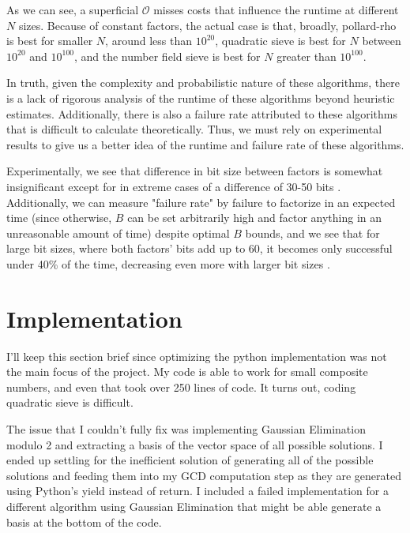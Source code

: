 \documentclass[11pt,reqno]{amsart}
\theoremstyle{definition}
\begin{document}
As we can see, a superficial $\mathcal{O}$ misses costs that influence the runtime at different $N$ sizes. Because of constant factors, the actual case is that, broadly, pollard-rho is best for smaller $N$, around less than $10^{20}$, quadratic sieve is best for $N$ between $10^{20}$ and $10^{100}$, and the number field sieve is best for $N$ greater than $10^{100}$.

In truth, given the complexity and probabilistic nature of these algorithms, there is a lack of rigorous analysis of the runtime of these algorithms beyond heuristic estimates. Additionally, there is also a failure rate attributed to these algorithms that is difficult to calculate theoretically. Thus, we must rely on experimental results to give us a better idea of the runtime and failure rate of these algorithms.

Experimentally, we see that difference in bit size between factors is somewhat insignificant except for in extreme cases of a difference of 30-50 bits \cite{li2021empirical}. Additionally, we can measure "failure rate" by failure to factorize in an expected time (since otherwise, $B$ can be set arbitrarily high and factor anything in an unreasonable amount of time) despite optimal $B$ bounds, and we see that for large bit sizes, where both factors' bits add up to 60, it becomes only successful under 40\% of the time, decreasing even more with larger bit sizes \cite{li2021empirical}.

\section{Implementation}

I'll keep this section brief since optimizing the python implementation was not the main focus of the project. My code is able to work for small composite numbers, and even that took over 250 lines of code. It turns out, coding quadratic sieve is difficult.

The issue that I couldn't fully fix was implementing Gaussian Elimination modulo 2 and extracting a basis of the vector space of all possible solutions. I ended up settling for the inefficient solution of generating all of the possible solutions and feeding them into my GCD computation step as they are generated using Python's yield instead of return. I included a failed implementation for a different algorithm using Gaussian Elimination that might be able generate a basis at the bottom of the code.
\end{document}
